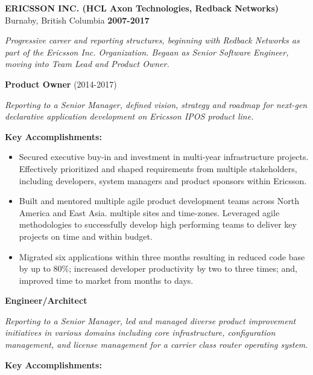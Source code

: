 \documentclass[
]{article}
\newcommand{\LR}[1]{\beginL #1\endL}
\begin{document}
\LR{}


\LR{\textbf{ERICSSON INC. (HCL Axon Technologies, Redback Networks)}
Burnaby, British Columbia \textbf{2007-2017}}

\emph{\LR{Progressive career and reporting structures, beginning with
Redback Networks as part of the Ericsson Inc. Organization. Begaan as
Senior Software Engineer, moving into Team Lead and Product Owner.}}

\LR{\textbf{Product Owner} (2014-2017)}

\emph{\LR{Reporting to a Senior Manager, defined vision, strategy and
roadmap for next-gen declarative application development on Ericsson
IPOS product line.}}

\textbf{\LR{Key Accomplishments:}}

\begin{itemize}
\item
  \LR{Secured executive buy-in and investment in multi-year
  infrastructure projects. Effectively prioritized and shaped
  requirements from multiple stakeholders, including developers, system
  managers and product sponsors within Ericsson.}
\item
  \LR{Built and mentored multiple agile product development teams across
  North America and East Asia. multiple sites and time-zones. Leveraged
  agile methodologies to successfully develop high performing teams to
  deliver key projects on time and within budget.}
\item
  \LR{Migrated six applications within three months resulting in reduced
  code base by up to 80\%; increased developer productivity by two to
  three times; and, improved time to market from months to days.}
\end{itemize}

\textbf{\LR{Engineer/Architect}}

\emph{\LR{Reporting to a Senior Manager, led and managed diverse product
improvement initiatives in various domains including core
infrastructure, configuration management, and license management for a
carrier class router operating system.}}

\textbf{\LR{Key Accomplishments:}}
\end{document}
